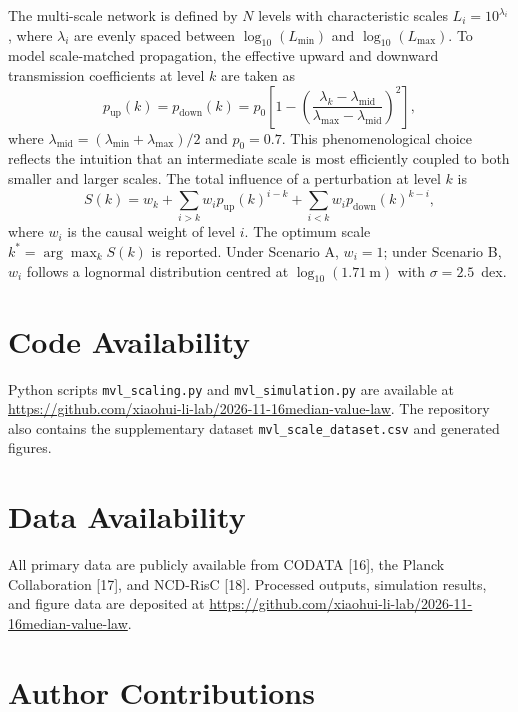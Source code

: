 \documentclass[11pt,a4paper]{article}
\begin{document}
The multi-scale network is defined by $N$ levels with characteristic scales $L_i = 10^{\lambda_i}$, where $\lambda_i$ are evenly spaced between $\log_{10}(L_{\min})$ and $\log_{10}(L_{\max})$. To model scale-matched propagation, the effective upward and downward transmission coefficients at level $k$ are taken as
\begin{equation}
p_{\mathrm{up}}(k) = p_{\mathrm{down}}(k) = p_0\left[1 - \left(\frac{\lambda_k - \lambda_{\mathrm{mid}}}{\lambda_{\max} - \lambda_{\mathrm{mid}}}\right)^2\right],
\end{equation}
where $\lambda_{\mathrm{mid}} = (\lambda_{\min}+\lambda_{\max})/2$ and $p_0=0.7$. This phenomenological choice reflects the intuition that an intermediate scale is most efficiently coupled to both smaller and larger scales. The total influence of a perturbation at level $k$ is
\begin{equation}
S(k) = w_k + \sum_{i>k} w_i p_{\mathrm{up}}(k)^{i-k} + \sum_{i<k} w_i p_{\mathrm{down}}(k)^{k-i},
\end{equation}
where $w_i$ is the causal weight of level $i$. The optimum scale $k^* = \arg\max_k S(k)$ is reported. Under Scenario A, $w_i=1$; under Scenario B, $w_i$ follows a lognormal distribution centred at $\log_{10}(1.71~\mathrm{m})$ with $\sigma=2.5$~dex.

\section*{Code Availability}

Python scripts \texttt{mvl\_scaling.py} and \texttt{mvl\_simulation.py} are available at \url{https://github.com/xiaohui-li-lab/2026-11-16median-value-law}. The repository also contains the supplementary dataset \texttt{mvl\_scale\_dataset.csv} and generated figures.

\section*{Data Availability}

All primary data are publicly available from CODATA [16], the Planck Collaboration [17], and NCD-RisC [18]. Processed outputs, simulation results, and figure data are deposited at \url{https://github.com/xiaohui-li-lab/2026-11-16median-value-law}.

\section*{Author Contributions}
\end{document}
